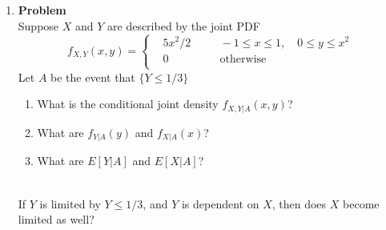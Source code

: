 \documentclass[12pt]{article}
\newenvironment{Ex}{\textbf{Problem}\vspace{.75em}\\}{}
\newcommand{\dd}[1]{\:\mathrm{d}{#1}}
\begin{document}
\begin{enumerate}
\begin{Ex}
\begin{solution}
\begin{enumerate}
\begin{equation}
\begin{aligned}
            &= \frac{28a}{9} \int_{2}^{4} 1 \dd{x} \\
            &= \frac{28a}{9} (4-2) \\
            &= \frac{56a}{9} \\
            \implies E\left[\frac{1}{X}|Y=3\right] &= \frac{1}{3} \\
          \end{aligned}
        \end{equation}
      \end{enumerate}
    \end{solution}
  \end{Ex}
\item
  \begin{Ex}
    Suppose $X$ and $Y$ are described by the joint PDF
    \begin{equation}
      \label{eq:2-question}
      f_{X,Y}(x,y) = \left\{
        \begin{aligned}
          &5x^2/2 &&\quad -1 \le x \le 1, \quad 0\le y \le x^2 \\
          &0 &&\quad \text{otherwise} \\
        \end{aligned} \right.
    \end{equation}
    Let $A$ be the event that $\{Y\le 1/3\}$
    \begin{enumerate}
    \item What is the conditional joint density $f_{X,Y|A}(x,y)$?
    \item What are $f_{Y|A}(y)$ and $f_{X|A}(x)$?
    \item What are $E[Y|A]$ and $E[X|A]$?
    \end{enumerate}
    \begin{solution} \hfill

      {\color{red}{\huge QUESTION}\\ If $Y$ is limited by $Y\le1/3$,
        and $Y$ is dependent on $X$, then does $X$ become limited as
        well?}


\end{solution}
\end{Ex}
\end{enumerate}
\end{document}
